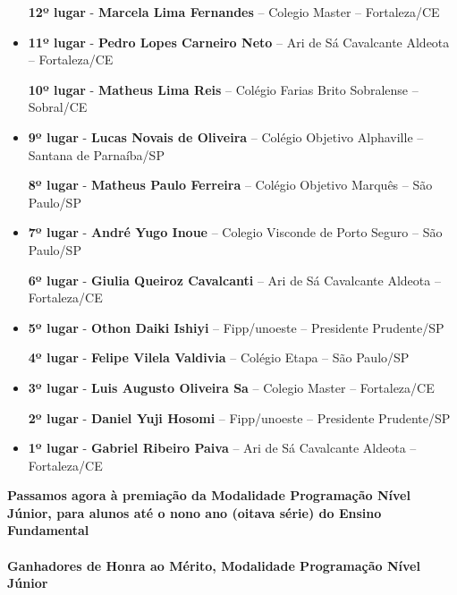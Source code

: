 \documentclass{article}
\begin{document}
\begin{itemize}
\textbf{12º lugar} - \textbf{Marcela Lima Fernandes} – Colegio Master – Fortaleza/CE



\item
\textbf{11º lugar} - \textbf{Pedro Lopes Carneiro Neto} – Ari de Sá Cavalcante Aldeota – Fortaleza/CE


\textbf{10º lugar} - \textbf{Matheus Lima Reis} – Colégio Farias Brito Sobralense – Sobral/CE



\item
\textbf{9º lugar} - \textbf{Lucas Novais de Oliveira} – Colégio Objetivo Alphaville – Santana de Parnaíba/SP


\textbf{8º lugar} - \textbf{Matheus Paulo Ferreira} – Colégio Objetivo Marquês – São Paulo/SP



\item
\textbf{7º lugar} - \textbf{André Yugo Inoue} – Colegio Visconde de Porto Seguro – São Paulo/SP


\textbf{6º lugar} - \textbf{Giulia Queiroz Cavalcanti} – Ari de Sá Cavalcante Aldeota – Fortaleza/CE



\item
\textbf{5º lugar} - \textbf{Othon Daiki Ishiyi} – Fipp/unoeste – Presidente Prudente/SP


\textbf{4º lugar} - \textbf{Felipe Vilela Valdivia} – Colégio Etapa – São Paulo/SP



\item
\textbf{3º lugar} - \textbf{Luis Augusto Oliveira Sa} – Colegio Master – Fortaleza/CE


\textbf{2º lugar} - \textbf{Daniel Yuji Hosomi} – Fipp/unoeste – Presidente Prudente/SP



\item
\textbf{1º lugar} - \textbf{Gabriel Ribeiro Paiva} – Ari de Sá Cavalcante Aldeota – Fortaleza/CE



\end{itemize}

\color{blue}
\textbf{Passamos agora à premiação da Modalidade Programação Nível Júnior, para alunos até o nono ano (oitava série) do Ensino Fundamental}\\\\
\textbf{\color{blue}Ganhadores de Honra ao Mérito, \color{black}Modalidade Programação Nível Júnior}
\color{black}
\end{document}
